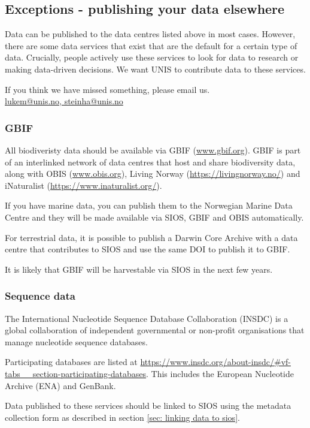 \documentclass[a4paper,12pt]{article}
\makeatletter
\newcommand{\emailauthors}{\href{mailto:lukem@unis.no,steinha@unis.no}{lukem@unis.no, steinha@unis.no}}
\makeatother
\begin{document}
\subsection{Exceptions - publishing your data elsewhere}

Data can be published to the data centres listed above in most cases. However, there are some data services that exist that are the default for a certain type of data. Crucially, people actively use these services to look for data to research or making data-driven decisions. We want UNIS to contribute data to these services. 

If you think we have missed something, please email us.\\

\emailauthors

\subsubsection{GBIF}

All biodiveristy data should be available via GBIF (\url{www.gbif.org}). GBIF is part of an interlinked network of data centres that host and share biodiversity data, along with OBIS (\url{www.obis.org}), Living Norway (\url{https://livingnorway.no/}) and iNaturalist (\url{https://www.inaturalist.org/}). 

If you have marine data, you can publish them to the Norwegian Marine Data Centre and they will be made available via SIOS, GBIF and OBIS automatically.

For terrestrial data, it is possible to publish a Darwin Core Archive with a data centre that contributes to SIOS and use the same DOI to publish it to GBIF. 

It is likely that GBIF will be harvestable via SIOS in the next few years.

\subsubsection{Sequence data}

The International Nucleotide Sequence Database Collaboration (INSDC) is a global collaboration of independent governmental or non-profit organisations that manage nucleotide sequence databases.

Participating databases are listed at 
\url{https://www.insdc.org/about-insdc/#vf-tabs__section-participating-databases}. 
This includes the European Nucleotide Archive (ENA) and GenBank.

Data published to these services should be linked to SIOS using the metadata collection form as described in section \ref{sec: linking data to sios}.
\end{document}
